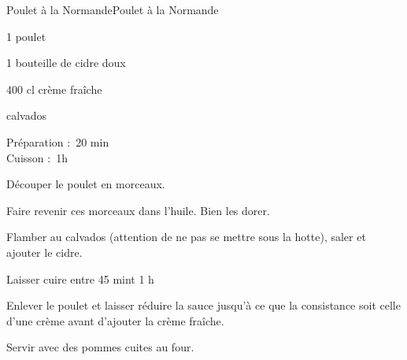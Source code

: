 \begin{recette}{Poulet à la Normande}{Poulet à la Normande}

\begin{ingredients}
1 poulet \par
1 bouteille de cidre doux\par
	400 cl crème fraîche\par
	calvados\par
\end{ingredients}

\begin{infos}
Préparation : 20 min\\
Cuisson : 1h\\
\end{infos}

\begin{etapes}
\item Découper le poulet en morceaux.
\item Faire revenir ces morceaux dans l’huile. Bien les dorer.
\item Flamber au calvados (attention de ne pas se mettre sous la hotte), saler et ajouter le cidre.
\item Laisser cuire entre 45 mint 1 h
\item Enlever le poulet et laisser réduire la sauce jusqu’à ce que la consistance soit celle d’une crème avant d'ajouter la crème fraîche.
\item Servir avec des pommes cuites au four.
\end{etapes}

\begin{conseils}
\end{conseils}

\end{recette}